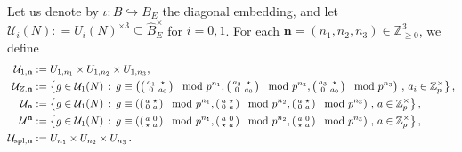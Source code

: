 \documentclass{amsart}
\numberwithin{equation}{section}
\newcommand{\Zp}{\mathbb{Z}_p}
\begin{document}
\subsubsection{}\label{subsec_2025_10_14_1351} Let us denote by $\iota: B \hookrightarrow B_E$ the diagonal embedding, and let $\mathcal{U}_i(N) : = U_i(N)^{\times 3} \subseteq \widehat{B}_E^{\times}$ for $i = 0,1$. For each $\mathbf{n}=(n_1,n_2,n_3) \in \mathbb{Z}_{\geq 0}^3$, we define 
\begin{align*}
    \mathcal{U}_{1,\mathbf{n}} &:=    U_{1,n_1} \times U_{1,n_2} \times U_{1,n_3}, 
    \\ 
    \mathcal{U}_{Z,\mathbf{n}} &:=\left \{ g \in  \mathcal{U}_{1}(N)\,:\, g \equiv \left(\left( \begin{smallmatrix}  a_1 & \star \\ 0 & a_0 \end{smallmatrix}\right) \mod p^{n_1},\left( \begin{smallmatrix}  a_2 & \star \\ 0 & a_0 \end{smallmatrix}\right) \mod p^{n_2},\left( \begin{smallmatrix} a_3 & \star \\ 0 & a_0 \end{smallmatrix}\right) \mod p^{n_3}\right)\, ,\,a_i \in\Zp^\times\right\},  \\ 
    \mathcal{U}_{\mathbf{n}} &:=\left \{ g \in  \mathcal{U}_{1}(N)\,:\, g \equiv \left(\left( \begin{smallmatrix}  a & \star \\ 0 & a \end{smallmatrix}\right) \mod p^{n_1},\left( \begin{smallmatrix}  a & \star \\ 0 & a \end{smallmatrix}\right) \mod p^{n_2},\left( \begin{smallmatrix} a & \star \\ 0 & a \end{smallmatrix}\right) \mod p^{n_3}\right)\, ,\,a \in\Zp^\times\right\},\\
    \mathcal{U}^{\mathbf{n}} &:=\left \{ g \in  \mathcal{U}_{1}(N)\,:\, g \equiv \left(\left( \begin{smallmatrix}  a & 0\\ \star  & a \end{smallmatrix}\right) \mod p^{n_1},\left( \begin{smallmatrix}  a &0 \\ \star  & a \end{smallmatrix}\right) \mod p^{n_2},\left( \begin{smallmatrix} a & 0 \\ \star  & a \end{smallmatrix}\right) \mod p^{n_3}\right)\, ,\,a \in\Zp^\times\right\}, \\ 
     \mathcal{U}_{{\rm spl},\mathbf{n}} &:=U_{n_1} \times U_{n_2} \times U_{n_3}\,.
\end{align*}
\end{document}
